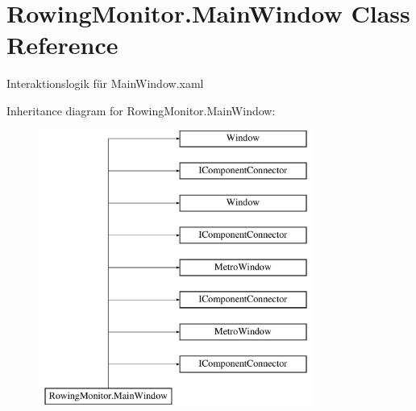\hypertarget{class_rowing_monitor_1_1_main_window}{}\section{Rowing\+Monitor.\+Main\+Window Class Reference}
\label{class_rowing_monitor_1_1_main_window}


Interaktionslogik für Main\+Window.\+xaml  


Inheritance diagram for Rowing\+Monitor.\+Main\+Window\+:\begin{figure}[H]
\begin{center}
\leavevmode
\includegraphics[height=9.000000cm]{class_rowing_monitor_1_1_main_window}
\end{center}
\end{figure}
